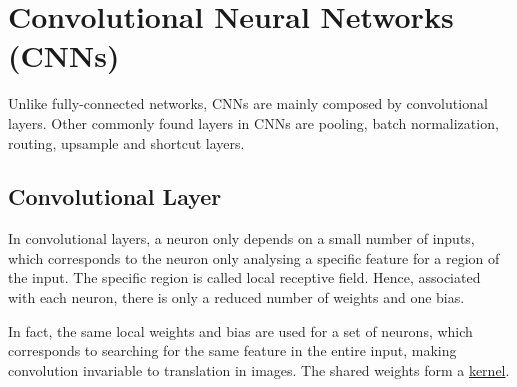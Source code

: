 
\section{Convolutional Neural Networks (CNNs)}
\label{section:cnns}

Unlike fully-connected networks, CNNs are mainly composed by convolutional
layers. Other commonly found layers in CNNs are pooling, batch normalization,
routing, upsample and shortcut layers.



\subsection{Convolutional Layer}
\label{subsection:conv_layer}

In convolutional layers, a neuron only depends on a small number of inputs,
which corresponds to the neuron only analysing a specific feature for a region
of the input. The specific region is called local receptive
  field. Hence, associated with each neuron, there is only a reduced number of
weights and one bias.

In fact, the same local weights and bias are used for a set of neurons, which
corresponds to searching for the same feature in the entire input, making
convolution invariable to translation in images. The shared weights form a
\underline{kernel}.


